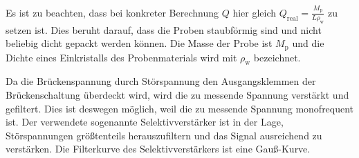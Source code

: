 Es ist zu beachten, dass bei konkreter Berechnung $Q$ hier gleich $Q_\text{real} =  \frac{M_\text{p}}{L \rho_\text{w}}$
zu setzen ist. Dies beruht darauf, dass die Proben staubförmig sind und nicht beliebig
dicht gepackt werden können. Die Masse der Probe ist $M_\text{p}$ und die Dichte eines Einkristalls
des Probenmaterials wird mit $\rho_\text{w}$ bezeichnet.

Da die Brückenspannung durch Störspannung den Ausgangsklemmen der Brückenschaltung
überdeckt wird, wird die zu messende Spannung verstärkt und gefiltert. Dies ist deswegen möglich, weil
die zu messende Spannung monofrequent ist. Der verwendete sogenannte Selektivverstärker
ist in der Lage, Störspannungen größtenteils herauszufiltern und das Signal ausreichend zu verstärken.
Die Filterkurve des Selektivverstärkers ist eine Gauß-Kurve.
